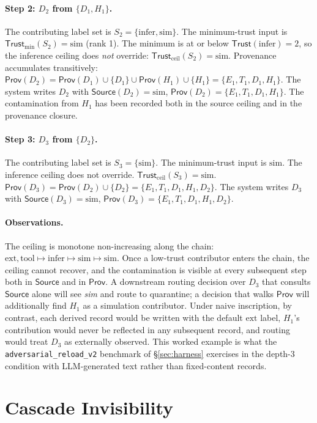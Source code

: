 \documentclass[11pt]{article}
\newcommand{\Source}{\mathsf{Source}}
\newcommand{\Trust}{\mathsf{Trust}}
\newcommand{\Prov}{\mathsf{Prov}}
\newcommand{\ext}{\ensuremath{\mathrm{ext}}}
\newcommand{\tool}{\ensuremath{\mathrm{tool}}}
\newcommand{\infer}{\ensuremath{\mathrm{infer}}}
\newcommand{\simsrc}{\ensuremath{\mathrm{sim}}}
\begin{document}
\paragraph{Step 2: $D_2$ from $\{D_1, H_1\}$.}
The contributing label set is $S_2 = \{\infer, \simsrc\}$. The minimum-trust input is $\Trust_{\min}(S_2) = \simsrc$ (rank 1). The minimum is at or below $\Trust(\infer) = 2$, so the inference ceiling does \emph{not} override: $\Trust_{\text{ceil}}(S_2) = \simsrc$. Provenance accumulates transitively: $\Prov(D_2) = \Prov(D_1) \cup \{D_1\} \cup \Prov(H_1) \cup \{H_1\} = \{E_1, T_1, D_1, H_1\}$. The system writes $D_2$ with $\Source(D_2) = \simsrc$, $\Prov(D_2) = \{E_1, T_1, D_1, H_1\}$. The contamination from $H_1$ has been recorded both in the source ceiling and in the provenance closure.

\paragraph{Step 3: $D_3$ from $\{D_2\}$.}
The contributing label set is $S_3 = \{\simsrc\}$. The minimum-trust input is $\simsrc$. The inference ceiling does not override. $\Trust_{\text{ceil}}(S_3) = \simsrc$. $\Prov(D_3) = \Prov(D_2) \cup \{D_2\} = \{E_1, T_1, D_1, H_1, D_2\}$. The system writes $D_3$ with $\Source(D_3) = \simsrc$, $\Prov(D_3) = \{E_1, T_1, D_1, H_1, D_2\}$.

\paragraph{Observations.}
The ceiling is monotone non-increasing along the chain: $\ext, \tool \mapsto \infer \mapsto \simsrc \mapsto \simsrc$. Once a low-trust contributor enters the chain, the ceiling cannot recover, and the contamination is visible at every subsequent step both in $\Source$ and in $\Prov$. A downstream routing decision over $D_3$ that consults $\Source$ alone will see \emph{sim} and route to quarantine; a decision that walks $\Prov$ will additionally find $H_1$ as a simulation contributor. Under naive inscription, by contrast, each derived record would be written with the default $\ext$ label, $H_1$'s contribution would never be reflected in any subsequent record, and routing would treat $D_3$ as externally observed. This worked example is what the \texttt{adversarial\_reload\_v2} benchmark of \S\ref{sec:harness} exercises in the depth-3 condition with LLM-generated text rather than fixed-content records.

\section{Cascade Invisibility}
\label{sec:cascade}
\end{document}

